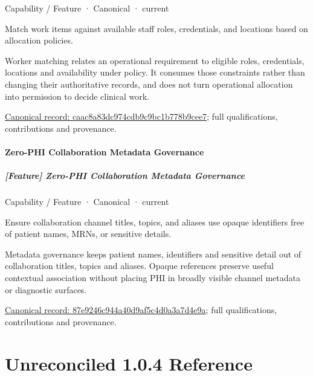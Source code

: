 \label{element:caac8a83dc974cdb9c9bc1b778b9cee7}
{\small Capability / Feature · Canonical · current}\par

Match work items against available staff roles, credentials, and locations based on allocation policies.



Worker matching relates an operational requirement to eligible roles, credentials, locations and availability under policy. It consumes those constraints rather than changing their authoritative records, and does not turn operational allocation into permission to decide clinical work.


{\footnotesize \href{../../../../continuum/strategy/capability/feature/caac8a83dc974cdb9c9bc1b778b9cee7.md}{Canonical record: caac8a83dc974cdb9c9bc1b778b9cee7}; full qualifications, contributions and provenance.}\par
\subsubsection{Zero-PHI Collaboration Metadata Governance}

\paragraph{[Feature] Zero-PHI Collaboration Metadata Governance}

\label{element:87e9246c944a40d9af5c4d0a3a7d4e9a}
{\small Capability / Feature · Canonical · current}\par

Ensure collaboration channel titles, topics, and aliases use opaque identifiers free of patient names, MRNs, or sensitive details.



Metadata governance keeps patient names, identifiers and sensitive detail out of collaboration titles, topics and aliases. Opaque references preserve useful contextual association without placing PHI in broadly visible channel metadata or diagnostic surfaces.


{\footnotesize \href{../../../../continuum/strategy/capability/feature/87e9246c944a40d9af5c4d0a3a7d4e9a.md}{Canonical record: 87e9246c944a40d9af5c4d0a3a7d4e9a}; full qualifications, contributions and provenance.}\par
\chapter{Unreconciled 1.0.4 Reference}

